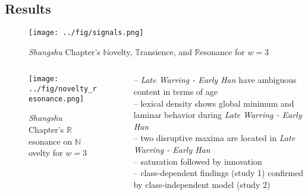 \subsection{Results}
\begin{frame}
\begin{figure}
	\centering
	\texttt{[image: ../fig/signals.png]}
	\caption{\emph{Shangshu} Chapter's $\mathbb{N}$ovelty, $\mathbb{T}$ransience, and $\mathbb{R}$esonance for $w = 3$}
\end{figure}

\begin{columns}
	\begin{column}{.5\textwidth}
		\begin{figure}
			\centering
			\texttt{[image: ../fig/novelty\_resonance.png]}
			\caption{\emph{Shangshu} Chapter's $\mathbb{R}$esonance on $\mathbb{N}$ovelty for $w = 3$}
		\end{figure}
	\end{column}
	\begin{column}{.5\textwidth}
		-- \emph{Late Warring - Early Han} have ambiguous content in terms of age\\
		-- lexical density shows global minimum and laminar behavior during \emph{Late Warring - Early Han}\\ 
		-- two disruptive maxima are located in \emph{Late Warring - Early Han}\\
		\medskip
		-- saturation followed by innovation\\
		-- class-dependent findings (study 1) confirmed by class-independent model (study 2)\\
	\end{column}
\end{columns}



\end{frame}






